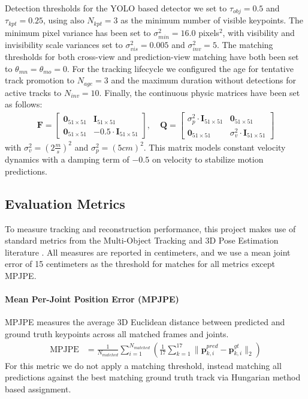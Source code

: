 Detection thresholds for the YOLO based detector we set to $\tau_{obj} = 0.5$ and $\tau_{kpt} = 0.25$, using also $N_{kpt} = 3$ as the minimum number of visible keypoints. The minimum pixel variance has been set to $\sigma_{min}^2 = 16.0$ pixels$^2$, with visibility and invisibility scale variances set to $\sigma_{vis}^2 = 0.005$ and $\sigma_{inv}^2 = 5$. The matching thresholds for both cross-view and prediction-view matching have both been set to $\theta_{mn} = \theta_{mo} = 0$. For the tracking lifecycle we configured the age for tentative track promotion to $N_{age} = 3$ and the maximum duration without detections for active tracks to $N_{inv} = 10$. Finally, the continuous physic matrices have been set as follows:
\begin{align*}
    \mathbf{F} = \begin{bmatrix} \mathbf{0}_{51 \times 51} & \mathbf{I}_{51 \times 51} \\ \mathbf{0}_{51 \times 51} & -0.5 \cdot \mathbf{I}_{51 \times 51} \end{bmatrix}, & \;
    \mathbf{Q} = \begin{bmatrix} \sigma_{p}^2 \cdot \mathbf{I}_{51 \times 51} & \mathbf{0}_{51 \times 51} \\ \mathbf{0}_{51 \times 51} & \sigma_{v}^2 \cdot \mathbf{I}_{51 \times 51} \end{bmatrix}
\end{align*}
with $\sigma_{v}^2 = (2 \frac{m}{s})^2$ and $\sigma_{p}^2 = (5 cm)^2$. This matrix models constant velocity dynamics with a damping term of $-0.5$ on velocity to stabilize motion predictions.


\subsection{Evaluation Metrics} \label{eval-metrics}

To measure tracking and reconstruction performance, this project makes use of standard metrics from the Multi-Object Tracking and 3D Pose Estimation literature \parencite{bernardin2008evaluating,ionescu2013human3}. All measures are reported in centimeters, and we use a mean joint error of 15 centimeters as the threshold for matches for all metrics except MPJPE.

\paragraph{Mean Per-Joint Position Error (MPJPE)}
MPJPE measures the average 3D Euclidean distance between predicted and ground truth keypoints across all matched frames and joints.
\begin{align*}
    \text{MPJPE} &= \frac{1}{N_{matched}} \sum_{i=1}^{N_{matched}} \left( \frac{1}{17} \sum_{k=1}^{17} \|\mathbf{p}_{k,i}^{pred} - \mathbf{p}_{k,i}^{gt}\|_2 \right)
\end{align*}
For this metric we do not apply a matching threshold, instead matching all predictions against the best matching ground truth track via Hungarian method based assignment.

